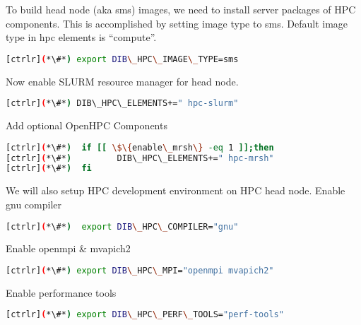 To build head node (aka sms) images, we need to install server packages of HPC components. This is accomplished by setting image type to sms. Default image type in hpc elements is “compute”.


\begin{lstlisting}[language=bash,keywords={}]
[ctrlr](*\#*) export DIB\_HPC\_IMAGE\_TYPE=sms
\end{lstlisting} 

Now enable SLURM resource manager for head node.


\begin{lstlisting}[language=bash,keywords={}]
[ctrlr](*\#*) DIB\_HPC\_ELEMENTS+=" hpc-slurm"
\end{lstlisting} 

Add optional OpenHPC Components


\begin{lstlisting}[language=bash,keywords={}]
[ctrlr](*\#*)  if [[ \$\{enable\_mrsh\} -eq 1 ]];then
[ctrlr](*\#*)         DIB\_HPC\_ELEMENTS+=" hpc-mrsh"
[ctrlr](*\#*)  fi
\end{lstlisting} 

We will also setup HPC development environment on HPC head node. 
Enable gnu compiler


\begin{lstlisting}[language=bash,keywords={}]
[ctrlr](*\#*)  export DIB\_HPC\_COMPILER="gnu"
\end{lstlisting} 

Enable openmpi \& mvapich2


\begin{lstlisting}[language=bash,keywords={}]
[ctrlr](*\#*) export DIB\_HPC\_MPI="openmpi mvapich2"
\end{lstlisting} 

Enable performance tools


\begin{lstlisting}[language=bash,keywords={}]
[ctrlr](*\#*) export DIB\_HPC\_PERF\_TOOLS="perf-tools"
\end{lstlisting} 

